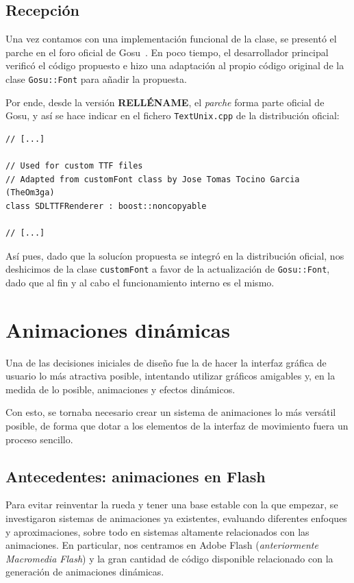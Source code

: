 \subsection{Recepción}

Una vez contamos con una implementación funcional de la clase, se presentó el
parche en el foro oficial de Gosu~\cite{foroGosu}. En poco tiempo, el
desarrollador principal verificó el código propuesto e hizo una adaptación al
propio código original de la clase \texttt{Gosu::Font} para añadir la
propuesta. 

Por ende, desde la versión \textbf{RELLÉNAME}, el \textit{parche} forma parte
oficial de Gosu, y así se hace indicar en el fichero \texttt{TextUnix.cpp} de la
distribución oficial:

\begin{verbatim}
// [...]

// Used for custom TTF files
// Adapted from customFont class by Jose Tomas Tocino Garcia (TheOm3ga)
class SDLTTFRenderer : boost::noncopyable

// [...]
\end{verbatim}

Así pues, dado que la solucíon propuesta se integró en la distribución oficial,
nos deshicimos de la clase \texttt{customFont} a favor de la actualización de
\texttt{Gosu::Font}, dado que al fin y al cabo el funcionamiento interno es
el mismo.

\section{Animaciones dinámicas}
\label{sec:animaciones}

Una de las decisiones iniciales de diseño fue la de hacer la interfaz gráfica de
usuario lo más atractiva posible, intentando utilizar gráficos amigables y, en
la medida de lo posible, animaciones y efectos dinámicos.

Con esto, se tornaba necesario crear un sistema de animaciones lo más versátil
posible, de forma que dotar a los elementos de la interfaz de movimiento fuera
un proceso sencillo. 

\subsection{Antecedentes: animaciones en Flash}
Para evitar reinventar la rueda y tener una base estable con la que empezar, se
investigaron sistemas de animaciones ya existentes, evaluando diferentes
enfoques y aproximaciones, sobre todo en sistemas altamente relacionados con las
animaciones. En particular, nos centramos en Adobe Flash (\textit{anteriormente
  Macromedia Flash}) y la gran cantidad de código disponible relacionado con la
generación de animaciones dinámicas.

